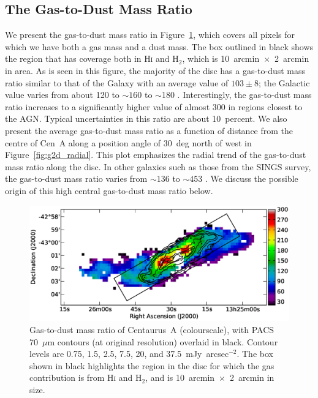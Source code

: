 \subsection{The Gas-to-Dust Mass Ratio}\label{subsec:gas2dust}
We present the gas-to-dust mass ratio in Figure~\ref{fig:g2d}, which covers all pixels for which we have both a gas mass and a dust mass.  The box outlined in black shows the region that has coverage both in H\textsc{i} and H$_{2}$, which is 10~arcmin~$\times$~2~arcmin in area.  As is seen in this figure, the majority of the disc has a gas-to-dust mass ratio similar to that of the Galaxy with an average value of $103 \pm 8$; the Galactic value varies from about 120 \citep{2001ApJ...554..778L} to $\sim 160$ \citep{2004ApJS..152..211Z} to $\sim$180 \citep[][and references therein]{2007ApJ...663..866D}.  Interestingly, the gas-to-dust mass ratio increases to a significantly higher value of almost 300 in regions closest to the AGN.  Typical uncertainties in this ratio are about 10~percent.  We also present the average gas-to-dust mass ratio as a function of distance from the centre of Cen~A along a position angle of 30~deg north of west in Figure~\ref{fig:g2d_radial}. This plot emphasizes the radial trend of the gas-to-dust mass ratio along the disc. In other galaxies such as those from the SINGS survey, the gas-to-dust mass ratio varies from $\sim 136$ to $\sim 453$ \citep{2007ApJ...663..866D}.  We discuss the possible origin of this high central gas-to-dust mass ratio below.
\begin{figure}
\includegraphics[width=\columnwidth]{ch2/Fig7_CenA_G2D}
\caption[Gas-to-dust mass ratio of Centaurus~A]{Gas-to-dust mass ratio of Centaurus~A (colourscale), with PACS 70~$\mu$m contours (at original resolution) overlaid in black.  Contour levels are 0.75, 1.5, 2.5, 7.5, 20, and 37.5~mJy~arcsec$^{-2}$.  The box shown in black highlights the region in the disc for which the gas contribution is from H\textsc{i} and H$_{2}$, and is 10~arcmin~$\times$~2~arcmin in size.}
\label{fig:g2d}
\end{figure}

